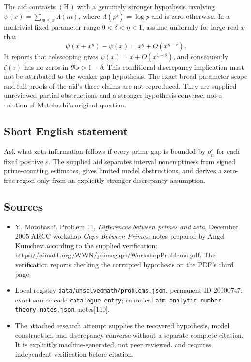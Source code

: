 \documentclass[11pt]{article}
\begin{document}
The aid contrasts \((\mathrm H)\) with a genuinely stronger hypothesis involving
\(\psi(x)=\sum_{m\leq x}\Lambda(m)\), where \(\Lambda(p^j)=\log p\) and is zero otherwise. In a nontrivial fixed parameter range \(0<\delta<\eta<1\), assume uniformly for large real \(x\) that
\[
\psi(x+x^\eta)-\psi(x)=x^\eta+O(x^{\eta-\delta}).
\]
It reports that telescoping gives \(\psi(x)=x+O(x^{1-\delta})\), and consequently \(\zeta(s)\) has no zeros in \(\Re s>1-\delta\). This conditional discrepancy implication must not be attributed to the weaker gap hypothesis. The exact broad parameter scope and full proofs of the aid's three claims are not reproduced. They are supplied unreviewed partial obstructions and a stronger-hypothesis converse, not a solution of Motohashi's original question.
\subsection{Short English statement}
Ask what zeta information follows if every prime gap is bounded by \(p_n^\varepsilon\) for each fixed positive \(\varepsilon\). The supplied aid separates interval nonemptiness from signed prime-counting estimates, gives limited model obstructions, and derives a zero-free region only from an explicitly stronger discrepancy assumption.
\subsection{Sources}
\begin{itemize}
\item Y. Motohashi, Problem 11, \emph{Differences between primes and zeta}, December 2005 ARCC workshop \emph{Gaps Between Primes}, notes prepared by Angel Kumchev according to the supplied verification: \url{https://aimath.org/WWN/primegaps/WorkshopProblems.pdf}. The verification reports checking the corrupted hypothesis on the PDF's third page.
\item Local registry \texttt{data/unsolvedmath/problems.json}, permanent ID \(20000747\), exact source code \texttt{catalogue entry}; canonical \texttt{aim-analytic-number-theory-notes.json}, notes[110].
\item The attached research attempt supplies the recovered hypothesis, model construction, and discrepancy converse without a separate complete citation. It is explicitly machine-generated, not peer reviewed, and requires independent verification before citation.
\end{itemize}
\end{document}
